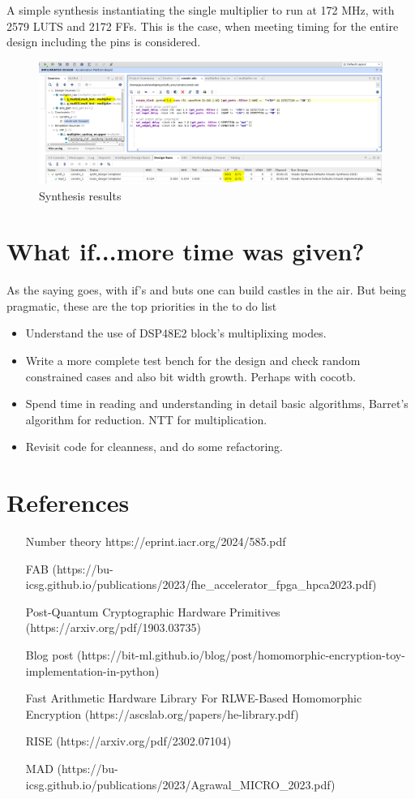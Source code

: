 \documentclass{article}
\begin{document}
    A simple synthesis instantiating the single multiplier to run at 172 MHz, with 2579 LUTS and 2172 FFs. This is the case, when meeting timing for the entire design including the pins is considered. 
  
    \begin{figure}[htp] 
      \centering
      \includegraphics[width=1\textwidth]{synthesis_results.png}
      \caption{Synthesis results}
      \label{fig:syn_result} 
    \end{figure}
       
    \section{What if...more time was given?}

    As the saying goes, with if's and buts one can build castles in the air. But being pragmatic, 
    these are the top priorities in the to do list
    \begin{itemize}
      \item Understand the use of DSP48E2 block's multiplixing modes. 
      \item Write a more complete test bench for the design and check random constrained cases and also bit width growth. Perhaps with cocotb.
      \item Spend time in reading and understanding  in detail basic algorithms, Barret's algorithm for reduction. NTT for multiplication.
      \item Revisit code for cleanness, and do some refactoring.
    \end{itemize}

\section{References}
\begin{itemize}
  \item [Number theory] https://eprint.iacr.org/2024/585.pdf
  \item [FAB](https://bu-icsg.github.io/publications/2023/fhe\_accelerator\_fpga\_hpca2023.pdf)
  \item [Post-Quantum Cryptographic Hardware Primitives](https://arxiv.org/pdf/1903.03735)
  \item [Blog post](https://bit-ml.github.io/blog/post/homomorphic-encryption-toy-implementation-in-python)
  \item [Fast Arithmetic Hardware Library For RLWE-Based Homomorphic Encryption](https://ascslab.org/papers/he-library.pdf)
  \item [RISE](https://arxiv.org/pdf/2302.07104)
  \item [MAD](https://bu-icsg.github.io/publications/2023/Agrawal\_MICRO\_2023.pdf)
\end{itemize}
\end{document}
